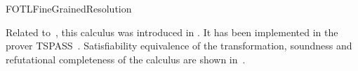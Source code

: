 \begin{entry}{FOTLFineGrainedResolution}
\begin{history}
Related to~, this calculus was introduced in
\cite{Ludwig+Hustadt@CADE2009}.
It has been implemented in the prover TSPASS~\cite{Ludwig+Hustadt@AIC2010}.
Satisfiability equivalence of the transformation, soundness and
refutational completeness of the calculus are shown in~\cite{Ludwig@Liverpool2010}.
\end{history}




%
%
%
%
%
%
% 
%






\end{entry}
